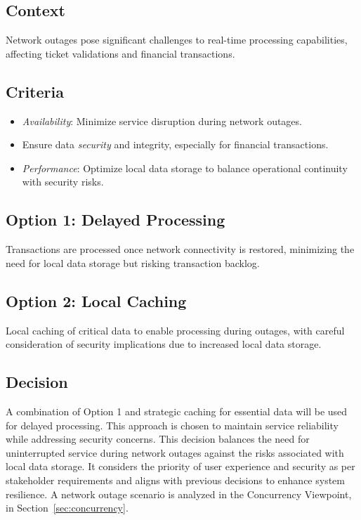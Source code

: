 \subsection*{Context}
Network outages pose significant challenges to real-time processing capabilities, affecting ticket validations and financial transactions.

\subsection*{Criteria}
\begin{itemize}[noitemsep]
    \item \textit{Availability}: Minimize service disruption during network outages.
    \item Ensure data \textit{security} and integrity, especially for financial transactions.
    \item \textit{Performance}: Optimize local data storage to balance operational continuity with security risks.
\end{itemize}

\subsection*{Option 1: Delayed Processing}
Transactions are processed once network connectivity is restored, minimizing the need for local data storage but risking transaction backlog.

\subsection*{Option 2: Local Caching}
Local caching of critical data to enable processing during outages, with careful consideration of security implications due to increased local data storage.

\subsection*{Decision}
A combination of Option 1 and strategic caching for essential data will be used for delayed processing. This approach is chosen to maintain service reliability while addressing security concerns.
This decision balances the need for uninterrupted service during network outages against the risks associated with local data storage. It considers the priority of user experience and security as per stakeholder requirements and aligns with previous decisions to enhance system resilience.
A network outage scenario is analyzed in the Concurrency Viewpoint, in Section~\ref{sec:concurrency}.

